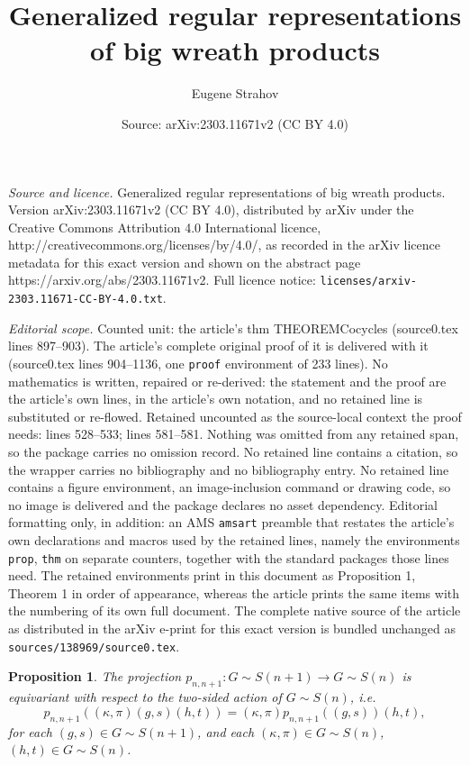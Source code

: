\documentclass[10pt,a4paper]{amsart}
\title{Generalized regular representations of big wreath products}
\author{Eugene Strahov}
\date{Source: arXiv:2303.11671v2 (CC BY 4.0)}
\newtheorem{prop}{Proposition}
\begin{document}
\maketitle

\noindent\emph{Source and licence.} Generalized regular representations of big wreath products. Version arXiv:2303.11671v2 (CC BY 4.0), distributed by arXiv under the Creative Commons Attribution 4.0 International licence, http://creativecommons.org/licenses/by/4.0/, as recorded in the arXiv licence metadata for this exact version and shown on the abstract page https://arxiv.org/abs/2303.11671v2. Full licence notice: \texttt{licenses/arxiv-2303.11671-CC-BY-4.0.txt}.\par\smallskip

\noindent\textit{Editorial scope.} Counted unit: the article's thm THEOREMCocycles (source0.tex lines 897--903). The article's complete original proof of it is delivered with it (source0.tex lines 904--1136, one \texttt{proof} environment of 233 lines). No mathematics is written, repaired or re-derived: the statement and the proof are the article's own lines, in the article's own notation, and no retained line is substituted or re-flowed.  Retained uncounted as the source-local context the proof needs: lines 528--533; lines 581--581.  Nothing was omitted from any retained span, so the package carries no omission record.  No retained line contains a citation, so the wrapper carries no bibliography and no bibliography entry.  No retained line contains a figure environment, an image-inclusion command or drawing code, so no image is delivered and the package declares no asset dependency.  Editorial formatting only, in addition: an AMS \texttt{amsart} preamble that restates the article's own declarations and macros used by the retained lines, namely the environments \texttt{prop}, \texttt{thm} on separate counters, together with the standard packages those lines need.  The retained environments print in this document as Proposition 1, Theorem 1 in order of appearance, whereas the article prints the same items with the numbering of its own full document.  The complete native source of the article as distributed in the arXiv e-print for this exact version is bundled unchanged as \texttt{sources/138969/source0.tex}.
\begin{prop}\label{PROPOSITIONEQUIVARIANCEPROJECTION}The projection $p_{n,n+1}: G\sim S(n+1)\longrightarrow G\sim S(n)$ is equivariant with respect to the two-sided action of $G\sim S(n)$, i.e.
$$
p_{n,n+1}\left((\kappa,\pi)(g,s)(h,t)\right)=(\kappa,\pi)p_{n,n+1}\left((g,s)\right)(h,t),
$$
for each $(g,s)\in G\sim S(n+1)$, and each $(\kappa,\pi)\in G\sim S(n)$, $(h,t)\in G\sim S(n)$.
\end{prop}
\end{document}
